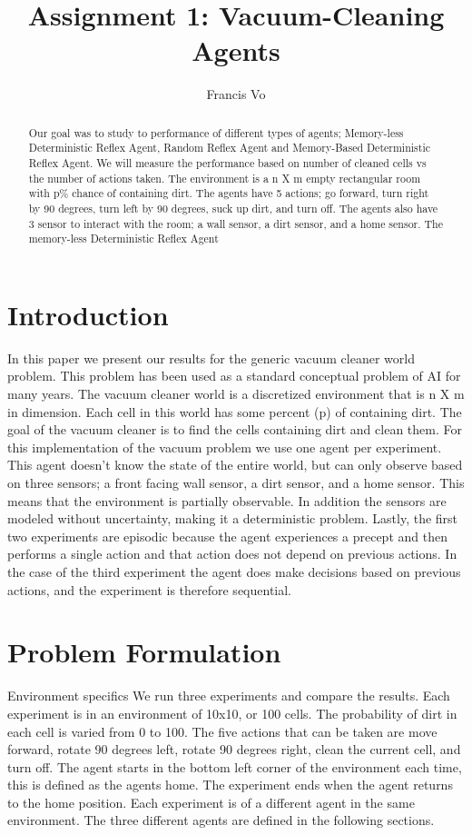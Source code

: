 \documentclass[a4paper,10pt]{article}
\title{Assignment 1: Vacuum-Cleaning Agents}
\author{Francis Vo}
\begin{document}
\maketitle
\begin{abstract}
Our goal was to study to performance of different types of agents; Memory-less Deterministic Reflex Agent, Random Reflex Agent and Memory-Based Deterministic Reflex Agent.
We will measure the performance based on number of cleaned cells vs the number of actions taken.
The environment is a n X m empty rectangular room with p\% chance of containing dirt.
The agents have 5 actions; go forward, turn right by 90 degrees, turn left by 90 degrees, suck up dirt, and turn off.
The agents also have 3 sensor to interact with the room; a wall sensor, a dirt sensor, and a home sensor.
The memory-less Deterministic Reflex Agent
\end{abstract}

\section{Introduction}

In this paper we present our results for the generic vacuum cleaner world problem.
This problem has been used as a standard conceptual problem of AI for many years.
The vacuum cleaner world is a discretized environment that is n X m in dimension.
Each cell in this world has some percent (p) of containing dirt.
The goal of the vacuum cleaner is to find the cells containing dirt and clean them.
For this implementation of the vacuum problem we use one agent per experiment.
This agent doesn't know the state of the entire world, but can only observe based on three sensors; a front facing wall sensor, a dirt sensor, and a home sensor.
This means that the environment is partially observable.
In addition the sensors are modeled without uncertainty, making it a deterministic problem.
Lastly, the first two experiments are episodic because the agent experiences a precept and then performs a single action and that action does not depend on previous actions.
In the case of the third experiment the agent does make decisions based on previous actions, and the experiment is therefore sequential.


\section{Problem Formulation}
Environment specifics
We run three experiments and compare the results.
Each experiment is in an environment of 10x10, or 100 cells.
The probability of dirt in each cell is varied from 0 to 100.
The five actions that can be taken are move forward, rotate 90 degrees left, rotate 90 degrees right, clean the current cell, and turn off.
The agent starts in the bottom left corner of the environment each time, this is defined as the agents home.
The experiment ends when the agent returns to the home position.
Each experiment is of a different agent in the same environment.
The three different agents are defined in the following sections.
\end{document}

